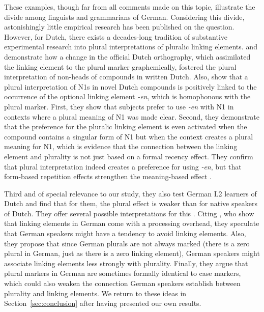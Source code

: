 These examples, though far from all comments made on this topic, illustrate the divide among linguists and grammarians of German.
Considering this divide, astonishingly little empirical research has been published on the question.
However, for Dutch, there exists a decades-long tradition of substantive experimental research into plural interpretations of pluralic linking elements.
\textcite{SchreuderEa1998} and \textcite{BangaEa2012} demonstrate how a change in the official Dutch orthography, which assimilated the linking element to the plural marker graphemically, fostered the plural interpretation of non-heads of compounds in written Dutch.
Also, \textcite{BangaEa2013a} show that a plural interpretation of N1s in novel Dutch compounds is positively linked to the occurrence of the optional linking element \mbox{\textit{-en}}, which is homophonous with the plural marker.
First, they show that subjects prefer to use \textit{-en} with N1 in contexts where a plural meaning of N1 was made clear.
Second, they demonstrate that the preference for the pluralic linking element is even activated when the compound contains a singular form of N1 but when the context creates a plural meaning for N1, which is evidence that the connection between the linking element and plurality is not just based on a formal recency effect.
They confirm that plural interpretation indeed creates a preference for using \textit{-en}, but that form-based repetition effects strengthen the meaning-based effect \parencite[45]{BangaEa2013a}.

Third and of special relevance to our study, they also test German L2 learners of Dutch and find that for them, the plural effect is weaker than for native speakers of Dutch.
They offer several possible interpretations for this \parencite[45--47]{BangaEa2013a}.
Citing \textcite{LibbenEa2002}, who show that linking elements in German come with a processing overhead, they speculate that German speakers might have a tendency to avoid linking elements.
Also, they propose that since German plurals are not always marked (there is a zero plural in German, just as there is a zero linking element), German speakers might associate linking elements less strongly with plurality.
Finally, they argue that plural markers in German are sometimes formally identical to case markers, which could also weaken the connection German speakers establish between plurality and linking elements.
We return to these ideas in Section~\ref{sec:conclusion} after having presented our own results.

